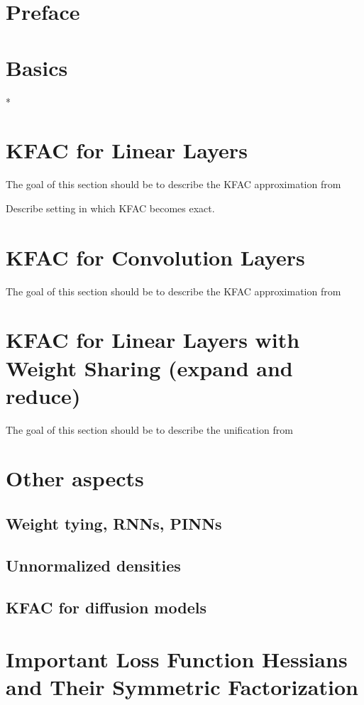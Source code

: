 \documentclass{article}
\begin{document}
\onecolumn


\clearpage

\tableofcontents
\clearpage

\section{Preface}

\clearpage

\begin{paracol}{2}
  \section{Basics}
  

  \switchcolumn[0]*
  \section{KFAC for Linear Layers}
  The goal of this section should be to describe the KFAC approximation from~\cite{martens2015optimizing}
  \begin{test}[KFAC]
    Describe setting in which KFAC becomes exact.
  \end{test}

  \section{KFAC for Convolution Layers}
  The goal of this section should be to describe the KFAC approximation from~\cite{grosse2016kroneckerfactored}

  \section{KFAC for Linear Layers with Weight Sharing (expand and reduce)}
  The goal of this section should be to describe the unification from~\cite{eschenhagen2023kroneckerfactored}

  \section{Other aspects}
  \subsection{Weight tying, RNNs, PINNs}
  \subsection{Unnormalized densities}
  \subsection{KFAC for diffusion models}

\end{paracol}

\clearpage


\appendix

\section{Important Loss Function Hessians and Their Symmetric Factorization}\label{app:loss_function_hessians}

\end{document}
